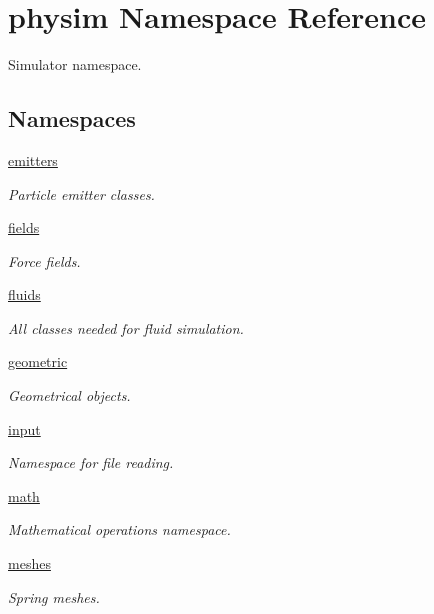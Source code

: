 \hypertarget{namespacephysim}{}\section{physim Namespace Reference}
\label{namespacephysim}


Simulator namespace.  


\subsection*{Namespaces}
\begin{DoxyCompactItemize}
\item 
 \hyperlink{namespacephysim_1_1emitters}{emitters}
\begin{DoxyCompactList}\small\item\em Particle emitter classes. \end{DoxyCompactList}\item 
 \hyperlink{namespacephysim_1_1fields}{fields}
\begin{DoxyCompactList}\small\item\em Force fields. \end{DoxyCompactList}\item 
 \hyperlink{namespacephysim_1_1fluids}{fluids}
\begin{DoxyCompactList}\small\item\em All classes needed for fluid simulation. \end{DoxyCompactList}\item 
 \hyperlink{namespacephysim_1_1geometric}{geometric}
\begin{DoxyCompactList}\small\item\em Geometrical objects. \end{DoxyCompactList}\item 
 \hyperlink{namespacephysim_1_1input}{input}
\begin{DoxyCompactList}\small\item\em Namespace for file reading. \end{DoxyCompactList}\item 
 \hyperlink{namespacephysim_1_1math}{math}
\begin{DoxyCompactList}\small\item\em Mathematical operations namespace. \end{DoxyCompactList}\item 
 \hyperlink{namespacephysim_1_1meshes}{meshes}
\begin{DoxyCompactList}\small\item\em Spring meshes. \end{DoxyCompactList}\item 

\end{DoxyCompactItemize}
